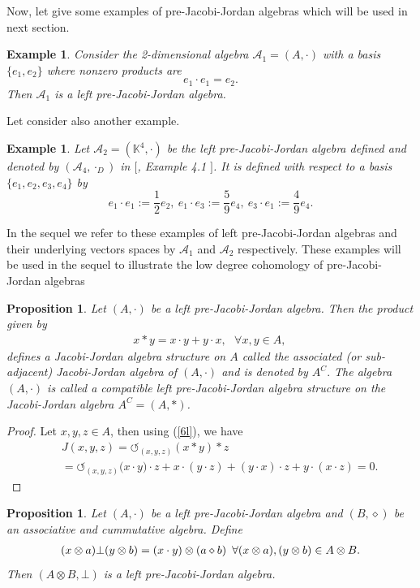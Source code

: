 \documentclass[12pt]{amsart}
\newtheorem{example}[Theorem]{Example}
\newtheorem{proposition}[Theorem]{Proposition}
\begin{document}
Now, let give some examples of pre-Jacobi-Jordan algebras which will be used in next section.
\begin{example}
	Consider the 2-dimensional algebra $ \mathcal{A}_1=(A,\cdot) $ with a basis $ \{e_{1},e_{2}\} $ where nonzero products are $$e_{1}\cdot e_{1}=e_{2}.  $$
	Then $ \mathcal{A}_1$ is a left pre-Jacobi-Jordan algebra. 	
\end{example}
Let consider also another example.
\begin{example}
	Let $ \mathcal{A}_2=(\mathbb{K}^4,\cdot) $ be the left pre-Jacobi-Jordan algebra defined and denoted by $(\mathcal{A}_4,\cdot_D)$ in $[$\cite{absbmm},
	Example 4.1 $]$. It is defined with respect to a basis $\{e_1, e_2, e_3, e_4 \}$ by 
	$$e_1\cdot e_1:=\frac{1}{2}e_2,\ e_1\cdot e_3:=\frac{5}{9}e_4,\ e_3\cdot e_1:=\frac{4}{9}e_4.$$
\end{example}
In the sequel we refer to these examples of left pre-Jacobi-Jordan algebras and their underlying vectors spaces by $\mathcal{A}_1$ and $\mathcal{A}_2$ respectively. These examples will be used in the sequel to illustrate the low degree cohomology of pre-Jacobi-Jordan algebras
	\begin{proposition}
		\label{Pro2}
		Let $ (A,\cdot) $ be a left pre-Jacobi-Jordan algebra. Then the product given by
		\begin{eqnarray}
			\label{27}
			x\ast y=x\cdot y+y\cdot x,  \mbox{ $\forall x,y\in A$, }\nonumber
		\end{eqnarray}
		defines a Jacobi-Jordan algebra structure on $ A $ called the associated (or sub-adjacent) Jacobi-Jordan algebra of $ (A,\cdot) $ and is denoted by $ A^{C}.$ The algebra $ (A,\cdot) $ is called a compatible left pre-Jacobi-Jordan algebra structure on the Jacobi-Jordan algebra $ A^{C}=(A,\ast) $.
	\end{proposition}
	\begin{proof}
		Let $ x,y,z\in A $, then using (\ref{6l}), we have
		\begin{eqnarray}
			&&	J(x,y,z)=\circlearrowleft_{(x,y,z)}(x\ast y)\ast z\nonumber\\
			&&	=\circlearrowleft_{(x,y,z)}\biggl(x\cdot y)\cdot z+x\cdot(y\cdot z)+(y\cdot x)\cdot z+y\cdot(x\cdot z)=0.\nonumber
		\end{eqnarray} 
	\end{proof}
	\begin{proposition}\label{Pro4}
		Let $ (A,\cdot) $ be a left pre-Jacobi-Jordan algebra and $ (B,\diamond) $ be an associative and cummutative algebra. Define
		\begin{eqnarray}
			\label{20}
			(x\otimes a)\bot (y\otimes b)=(x\cdot y)\otimes(a\diamond b ) 
			\mbox{\,\ $\forall (x\otimes a),(y\otimes b)\in A\otimes B$.}	
		\end{eqnarray}
		Then $ (A\otimes B,\bot) $ is a left pre-Jacobi-Jordan algebra.
	\end{proposition}
\end{document}
